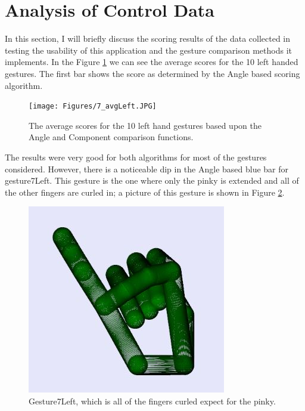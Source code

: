 \section{Analysis of Control Data }
In this section, I will briefly discuss the scoring results of the data collected in testing the usability of this application and the gesture comparison methods it implements. In the Figure \ref{fig:leftAvgs} we can see the average scores for the 10 left handed gestures. The first bar shows the score as determined by the Angle based scoring algorithm. 
\begin{figure}[H]
\centering
\texttt{[image: Figures/7\_avgLeft.JPG]}
\caption[Averages for Left Hand Gestures]{The average scores for the 10 left hand gestures based upon the Angle and Component comparison functions.}
\label{fig:leftAvgs}
\end{figure}
The results were very good for both algorithms for most of the gestures considered. However, there is a noticeable dip in the Angle based blue bar for gesture7Left. This gesture is the one where only the pinky is extended and all of the other fingers are curled in; a picture of this gesture is shown in Figure \ref{fig:gesture7Leftagain}.
\begin{figure}[H]
\centering
\includegraphics[scale=0.75]{Figures/gesture7Left.JPG}
\caption[Gesture7Left]{Gesture7Left, which is all of the fingers curled expect for the pinky.}
\label{fig:gesture7Leftagain}
\end{figure}
